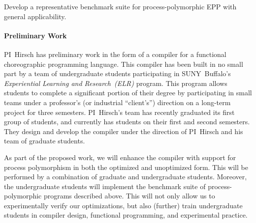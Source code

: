 \begin{goal}
  Develop a representative benchmark suite for process-polymorphic EPP with general applicability.
\end{goal}

%
%
%

\paragraph{Preliminary Work}
PI~Hirsch has preliminary work in the form of a compiler for a functional choreographic programming language.
This compiler has been built in no small part by a team of undergraduate students participating in SUNY~Buffalo's \emph{Experiential Learning and Research~(ELR)} program.
This program allows students to complete a significant portion of their degree by participating in small teams under a professor's (or industrial ``client's'') direction on a long-term project for three semesters.
PI~Hirsch's team has recently graduated its first group of students, and currently has students on their first and second semesters.
They design and develop the compiler under the direction of PI~Hirsch and his team of graduate students.

As part of the proposed work, we will enhance the compiler with support for process polymorphism in both the optimized and unoptimized form.
This will be performed by a combination of graduate and undergraduate students.
Moreover, the undergraduate students will implement the benchmark suite of process-polymorphic programs described above.
This will not only allow us to experimentally verify our optimizations, but also (further) train undergraduate students in compiler design, functional programming, and experimental practice.

